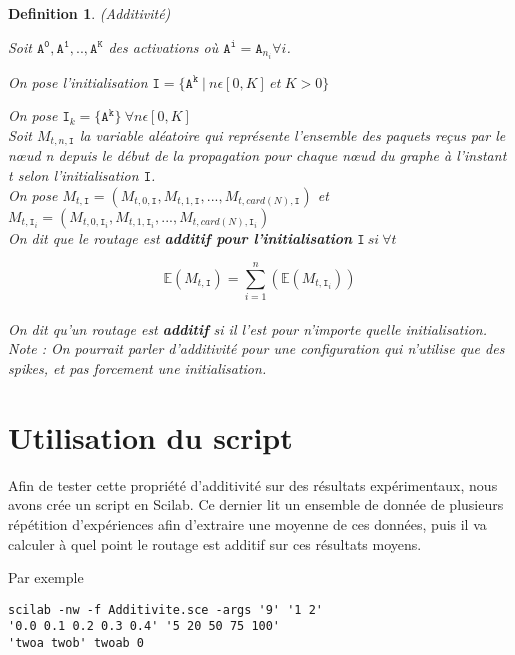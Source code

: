 \documentclass{report}
\newtheorem{mydef}{Definition}
\begin{document}
\begin{mydef}
(Additivité)

Soit $\mathtt{A^0},\mathtt{A^1}, .. ,\mathtt{A^K}$ des activations où $\mathtt{A^i}=\mathtt{A}_{n_i} \forall i$.

On pose l'initialisation $\mathtt{I}=\{\mathtt{A^k}\ |\ n\epsilon[0,K]\ et\ K>0\}\  $ 

On pose $\mathtt{I}_k = \{\mathtt{A^k}\}\ \forall n\epsilon[0,K]$\\

Soit $M_{t,n,\mathtt{I}}$ la variable aléatoire qui représente l'ensemble des paquets reçus par le nœud n depuis le début de la propagation pour chaque nœud du graphe à l'instant t selon l'initialisation $\mathtt{I}$.\\

On pose $M_{t,\mathtt{I}}=(M_{t,0,\mathtt{I}},M_{t,1,\mathtt{I}},...,M_{t,card(N),\mathtt{I}})$ et $M_{t,\mathtt{I}_i}=(M_{t,0,\mathtt{I}_i},M_{t,1,\mathtt{I}_i},...,M_{t,card(N),\mathtt{I}_i})$ \\

On dit que le routage est \textbf{additif pour l'initialisation} $\mathtt{I}\ si\ \forall t$  

\[\mathbb{E} (M_{t,\mathtt{I}}) = \sum_{i=1}^{n} (\mathbb{E} (M_{t,\mathtt{I}_i})) \]\\

On dit qu'un routage est \textbf{additif} si il l'est pour n'importe quelle initialisation.\\

Note : On pourrait parler d'additivité pour une configuration qui n'utilise que des spikes, et pas forcement une initialisation.
\end{mydef}

\section{Utilisation du script}

Afin de tester cette propriété d'additivité sur des résultats expérimentaux, nous avons crée un script en Scilab. Ce dernier lit un ensemble de donnée de plusieurs répétition d'expériences afin d'extraire une moyenne de ces données, puis il va calculer à quel point le routage est additif sur ces résultats moyens.


Par exemple 
\begin{verbatim} 
scilab -nw -f Additivite.sce -args '9' '1 2' 
'0.0 0.1 0.2 0.3 0.4' '5 20 50 75 100' 
'twoa twob' twoab 0 
\end{verbatim}
\end{document}
